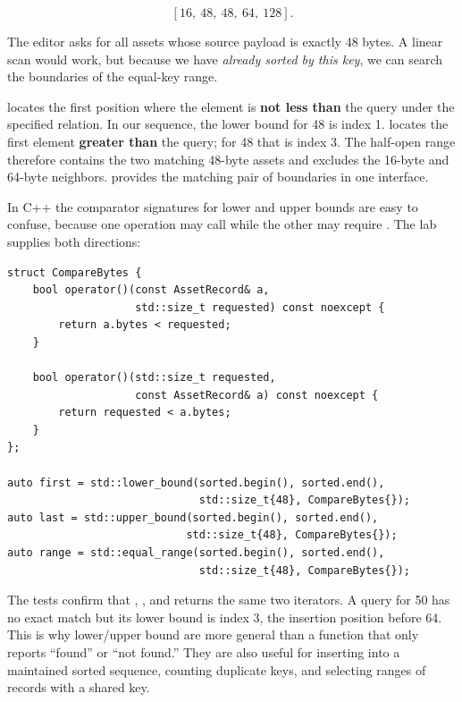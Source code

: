 \[
[16,\ 48,\ 48,\ 64,\ 128].
\]

The editor asks for all assets whose source payload is exactly 48 bytes. A linear scan would work, but because we have \emph{already sorted by this key}, we can search the boundaries of the equal-key range.

 locates the first position where the element is \textbf{not less than} the query under the specified relation. In our sequence, the lower bound for 48 is index 1.  locates the first element \textbf{greater than} the query; for 48 that is index 3. The half-open range \BookInlineCode{{[}1,3)} therefore contains the two matching 48-byte assets and excludes the 16-byte and 64-byte neighbors.  provides the matching pair of boundaries in one interface.

In C++ the comparator signatures for lower and upper bounds are easy to confuse, because one operation may call  while the other may require . The lab supplies both directions:

\begin{verbatim}
struct CompareBytes {
    bool operator()(const AssetRecord& a,
                    std::size_t requested) const noexcept {
        return a.bytes < requested;
    }

    bool operator()(std::size_t requested,
                    const AssetRecord& a) const noexcept {
        return requested < a.bytes;
    }
};

auto first = std::lower_bound(sorted.begin(), sorted.end(),
                              std::size_t{48}, CompareBytes{});
auto last = std::upper_bound(sorted.begin(), sorted.end(),
                            std::size_t{48}, CompareBytes{});
auto range = std::equal_range(sorted.begin(), sorted.end(),
                              std::size_t{48}, CompareBytes{});
\end{verbatim}

The tests confirm that , , and  returns the same two iterators. A query for 50 has no exact match but its lower bound is index 3, the insertion position before 64. This is why lower/upper bound are more general than a function that only reports ``found'' or ``not found.'' They are also useful for inserting into a maintained sorted sequence, counting duplicate keys, and selecting ranges of records with a shared key.

